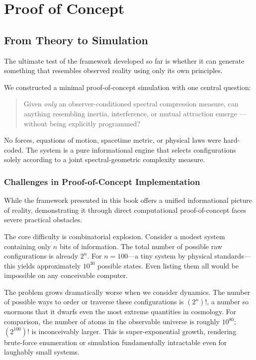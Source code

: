 \chapter{Proof of Concept}
\label{chap:proof-of-concept}

\section{From Theory to Simulation}

The ultimate test of the \iame framework developed so far is whether it can generate something that resembles observed reality using only its own principles.

We constructed a minimal proof-of-concept simulation with one central question:

\begin{quote}
Given \emph{only} an observer-conditioned spectral compression measure, can anything resembling inertia, interference, or mutual attraction emerge — without being explicitly programmed?
\end{quote}

No forces, equations of motion, spacetime metric, or physical laws were hard-coded.
The system is a pure informational engine that selects configurations solely according to a joint spectral-geometric complexity measure.


\subsection{Challenges in Proof-of-Concept Implementation}

While the framework presented in this book offers a unified informational picture of reality, demonstrating it through direct computational proof-of-concept faces severe practical obstacles.

The core difficulty is combinatorial explosion. Consider a modest system containing only \(n\) bits of information. The total number of possible raw configurations is already \(2^n\). For \(n = 100\)—a tiny system by physical standards—this yields approximately \(10^{30}\) possible states.
Even listing them all would be impossible on any conceivable computer.

The problem grows dramatically worse when we consider dynamics.
The number of possible ways to order or traverse these configurations is \((2^n)!\), a number so enormous that it dwarfs even the most extreme quantities in cosmology.
For comparison, the number of atoms in the observable universe is roughly \(10^{80}\); \((2^{100})!\) is inconceivably larger.
This is super-exponential growth, rendering brute-force enumeration or simulation fundamentally intractable even for laughably small systems.


